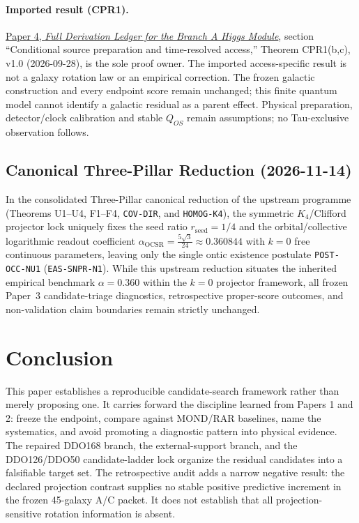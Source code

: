 \documentclass[11pt]{article}
\begin{document}
\paragraph{Imported result (CPR1).}
\href{https://github.com/tau-core-research/tau-core-higgs-module-paper4/blob/main/paper4_full_derivation/full_derivation.pdf#nameddest=cpr1}{Paper 4, \emph{Full Derivation Ledger for the Branch A Higgs Module}}, section ``Conditional source preparation and time-resolved access,'' Theorem CPR1(b,c), v1.0 (2026-09-28), is the sole proof owner.
The imported access-specific result is not a galaxy rotation law or an empirical correction. The frozen galactic construction and every endpoint score remain unchanged; this finite quantum model cannot identify a galactic residual as a parent effect.
Physical preparation, detector/clock calibration and stable $Q_{OS}$ remain assumptions; no Tau-exclusive observation follows.

\subsection{Canonical Three-Pillar Reduction (2026-11-14)}
In the consolidated Three-Pillar canonical reduction of the upstream programme (Theorems U1--U4, F1--F4, \texttt{COV-DIR}, and \texttt{HOMOG-K4}), the symmetric $K_4$/Clifford projector lock uniquely fixes the seed ratio $r_{\mathrm{seed}} = 1/4$ and the orbital/collective logarithmic readout coefficient $\alpha_{\mathrm{OCSR}} = \frac{5\sqrt{3}}{24} \approx 0.360844$ with $k = 0$ free continuous parameters, leaving only the single ontic existence postulate \texttt{POST-OCC-NU1} (\texttt{EAS-SNPR-N1}). While this upstream reduction situates the inherited empirical benchmark $\alpha = 0.360$ within the $k = 0$ projector framework, all frozen Paper~3 candidate-triage diagnostics, retrospective proper-score outcomes, and non-validation claim boundaries remain strictly unchanged.

\section{Conclusion}

This paper establishes a reproducible candidate-search framework rather than merely proposing one. It carries forward the discipline learned from Papers 1 and 2: freeze the endpoint, compare against MOND/RAR baselines, name the systematics, and avoid promoting a diagnostic pattern into physical evidence. The repaired DDO168 branch, the external-support branch, and the DDO126/DDO50 candidate-ladder lock organize the residual candidates into a falsifiable target set. The retrospective audit adds a narrow negative result: the declared projection contrast supplies no stable positive predictive increment in the frozen 45-galaxy A/C packet. It does not establish that all projection-sensitive rotation information is absent.
\end{document}
